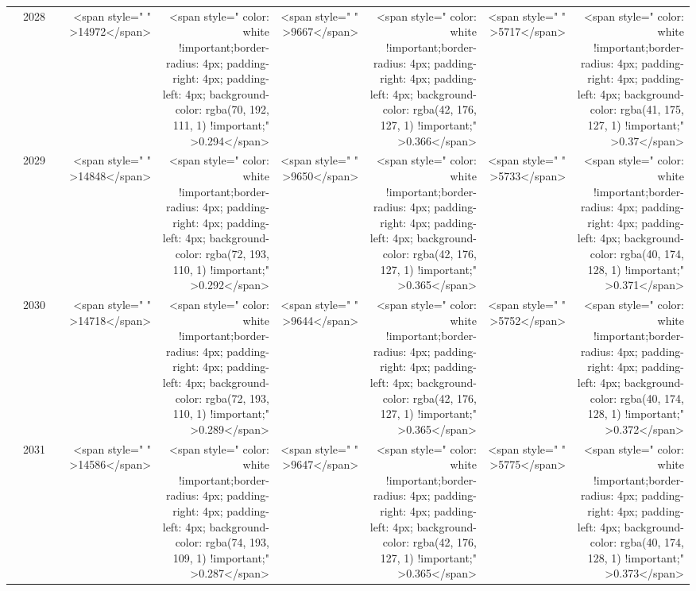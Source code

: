 \begin{table}
\begin{tabular}[t]{>{}l|l>{}rr>{}r|rrrr}
 & 2028 & \cellcolor[HTML]{50576C}{\textcolor{white}{796}} & <span style="     " >14972</span> & <span style="     color: white !important;border-radius: 4px; padding-right: 4px; padding-left: 4px; background-color: rgba(70, 192, 111, 1) !important;" >0.294</span> & <span style="     " >9667</span> & <span style="     color: white !important;border-radius: 4px; padding-right: 4px; padding-left: 4px; background-color: rgba(42, 176, 127, 1) !important;" >0.366</span> & <span style="     " >5717</span> & <span style="     color: white !important;border-radius: 4px; padding-right: 4px; padding-left: 4px; background-color: rgba(41, 175, 127, 1) !important;" >0.37</span>\\

 & 2029 & \cellcolor[HTML]{4E576C}{\textcolor{white}{798}} & <span style="     " >14848</span> & <span style="     color: white !important;border-radius: 4px; padding-right: 4px; padding-left: 4px; background-color: rgba(72, 193, 110, 1) !important;" >0.292</span> & <span style="     " >9650</span> & <span style="     color: white !important;border-radius: 4px; padding-right: 4px; padding-left: 4px; background-color: rgba(42, 176, 127, 1) !important;" >0.365</span> & <span style="     " >5733</span> & <span style="     color: white !important;border-radius: 4px; padding-right: 4px; padding-left: 4px; background-color: rgba(40, 174, 128, 1) !important;" >0.371</span>\\

 & 2030 & \cellcolor[HTML]{50576C}{\textcolor{white}{796}} & <span style="     " >14718</span> & <span style="     color: white !important;border-radius: 4px; padding-right: 4px; padding-left: 4px; background-color: rgba(72, 193, 110, 1) !important;" >0.289</span> & <span style="     " >9644</span> & <span style="     color: white !important;border-radius: 4px; padding-right: 4px; padding-left: 4px; background-color: rgba(42, 176, 127, 1) !important;" >0.365</span> & <span style="     " >5752</span> & <span style="     color: white !important;border-radius: 4px; padding-right: 4px; padding-left: 4px; background-color: rgba(40, 174, 128, 1) !important;" >0.372</span>\\

 & 2031 & \cellcolor[HTML]{52596C}{\textcolor{white}{793}} & <span style="     " >14586</span> & <span style="     color: white !important;border-radius: 4px; padding-right: 4px; padding-left: 4px; background-color: rgba(74, 193, 109, 1) !important;" >0.287</span> & <span style="     " >9647</span> & <span style="     color: white !important;border-radius: 4px; padding-right: 4px; padding-left: 4px; background-color: rgba(42, 176, 127, 1) !important;" >0.365</span> & <span style="     " >5775</span> & <span style="     color: white !important;border-radius: 4px; padding-right: 4px; padding-left: 4px; background-color: rgba(40, 174, 128, 1) !important;" >0.373</span>\\


\end{tabular}
\end{table}

